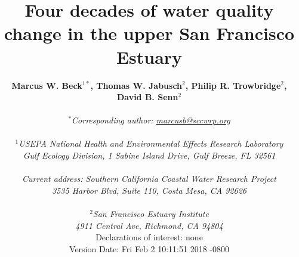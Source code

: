 \documentclass[letterpaper,12pt,oneside]{article}\usepackage[]{graphicx}\usepackage[]{color}
\begin{document}
\raggedbottom
\linenumbers
\raggedright
{}
\setlength{\parindent}{0.5in}
\renewcommand\refname{References \vspace{12pt}}

\begin{singlespace}
\title{{\bf {\Large Four decades of water quality change in the upper San Francisco Estuary}}}
\author{
  {\bf {\normalsize Marcus W. Beck$^{1*}$, Thomas W. Jabusch$^2$, Philip R. Trowbridge$^2$, David B. Senn$^2$}}
  \\\\{\textit {\normalsize $^*$Corresponding author: \href{mailto:marcusb@sccwrp.org}{marcusb@sccwrp.org}}}
  \\\\{\textit {\normalsize $^1$USEPA National Health and Environmental Effects Research Laboratory}}
  \\{\textit {\normalsize Gulf Ecology Division, 1 Sabine Island Drive, Gulf Breeze, FL 32561}}
  \\\\{\textit {\normalsize Current address: Southern California Coastal Water Research Project}}
  \\{\textit {\normalsize 3535 Harbor Blvd, Suite 110, Costa Mesa, CA 92626}}
  \\\\{\textit {\normalsize $^2$San Francisco Estuary Institute}}
	\\{\textit {\normalsize 4911 Central Ave, Richmond, CA 94804}}
  \vspace{1in}
  \\{Declarations of interest: none}
  \vspace{0.1in}
  \\ Version Date:   Fri Feb 2 10:11:51 2018 -0800
	}
\date{}
\maketitle
\end{singlespace}
\clearpage
\end{document}
